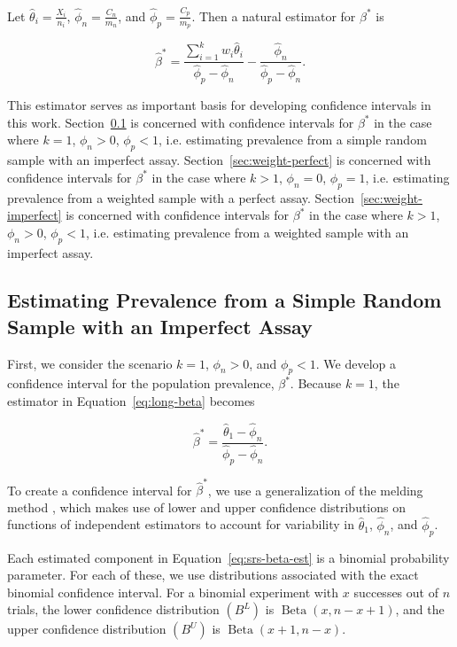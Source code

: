 \documentclass[AMA,STIX1COL]{WileyNJD-v2}
\begin{document}
Let \( \hat{\theta}_i = \frac{X_i}{n_i} \), \( \hat{\phi}_n = \frac{C_n}{m_n} \), and \( \hat{\phi}_p = \frac{C_p}{m_p} \).
Then a natural estimator for \( \beta^* \) is 

\begin{equation}
    \hat{\beta}^* = \frac{\sum_{i=1}^k w_i \hat{\theta}_i}{\hat{\phi}_p - \hat{\phi}_n} - \frac{\hat{\phi}_n}{\hat{\phi}_p - \hat{\phi}_n}.
\end{equation}

This estimator serves as important basis for developing confidence intervals in this work.
Section~\ref{sec:srs-imperfect} is concerned with confidence intervals for  \( \beta^* \) in the case where \( k = 1 \), \( \phi_n > 0 \), \( \phi_p < 1 \), i.e. estimating prevalence from a simple random sample with an imperfect assay.
Section~\ref{sec:weight-perfect} is concerned with confidence intervals for  \( \beta^* \) in the case where \( k > 1 \), \( \phi_n = 0 \), \( \phi_p = 1 \), i.e. estimating prevalence from a weighted sample with a perfect assay.
Section~\ref{sec:weight-imperfect} is concerned with confidence intervals for  \( \beta^* \) in the case where \( k > 1 \), \( \phi_n > 0 \), \( \phi_p < 1 \), i.e. estimating prevalence from a weighted sample with an imperfect assay.

\subsection{Estimating Prevalence from a Simple Random Sample with an Imperfect Assay}
\label{sec:srs-imperfect}

First, we consider the scenario \( k = 1 \), \( \phi_n > 0 \), and \( \phi_p < 1 \).
We develop a confidence interval for the population prevalence, \( \beta^* \).
Because \( k = 1 \), the estimator in Equation~\ref{eq:long-beta} becomes 

\begin{equation}
\hat{\beta}^* = \frac{\hat{\theta}_1 - \hat{\phi}_n}{\hat{\phi}_p - \hat{\phi}_n}.
\label{eq:srs-beta-est}
\end{equation}

To create a confidence interval for \( \hat{\beta}^* \), we use a generalization of the melding method \cite{FayP:2015}, which makes use of lower and upper confidence distributions on functions of independent estimators to account for variability in \( \hat{\theta}_1 \), \( \hat{\phi}_n \), and \( \hat{\phi}_p \).

Each estimated component in Equation~\ref{eq:srs-beta-est} is a binomial probability parameter.
For each of these, we use distributions associated with  the exact binomial confidence interval.
For a binomial experiment with \( x \) successes out of \( n \) trials, the lower confidence distribution \( (B^L) \) is \( \operatorname{Beta}(x, n - x + 1) \), and the upper confidence distribution \( (B^U) \) is \( \operatorname{Beta}(x + 1, n - x)\).
\end{document}
